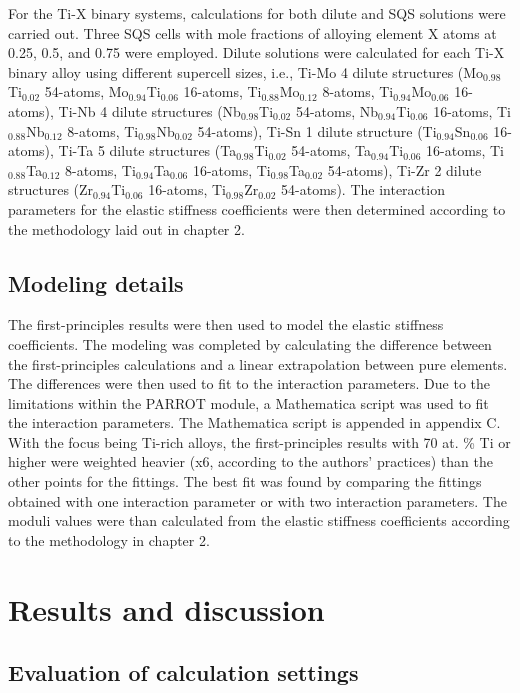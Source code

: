 For the Ti-X binary systems, calculations for both dilute and SQS solutions were carried out. Three SQS cells with mole fractions of alloying element X atoms at 0.25, 0.5, and 0.75 were employed. Dilute solutions were calculated for each Ti-X binary alloy using different supercell sizes, i.e., Ti-Mo 4 dilute structures (Mo$_{0.98}$Ti$_{0.02}$ 54-atoms, Mo$_{0.94}$Ti$_{0.06}$ 16-atoms, Ti$_{0.88}$Mo$_{0.12}$ 8-atoms, Ti$_{0.94}$Mo$_{0.06}$ 16-atoms), Ti-Nb 4 dilute structures (Nb$_{0.98}$Ti$_{0.02}$ 54-atoms, Nb$_{0.94}$Ti$_{0.06}$ 16-atoms, Ti$_{0.88}$Nb$_{0.12}$ 8-atoms, Ti$_{0.98}$Nb$_{0.02}$ 54-atoms), Ti-Sn 1 dilute structure (Ti$_{0.94}$Sn$_{0.06}$ 16-atoms), Ti-Ta 5 dilute structures (Ta$_{0.98}$Ti$_{0.02}$ 54-atoms, Ta$_{0.94}$Ti$_{0.06}$ 16-atoms, Ti$_{0.88}$Ta$_{0.12}$ 8-atoms, Ti$_{0.94}$Ta$_{0.06}$ 16-atoms, Ti$_{0.98}$Ta$_{0.02}$ 54-atoms), Ti-Zr 2 dilute structures (Zr$_{0.94}$Ti$_{0.06}$ 16-atoms, Ti$_{0.98}$Zr$_{0.02}$ 54-atoms). The interaction parameters for the  elastic stiffness coefficients were then determined according to the methodology laid out in chapter 2.

\subsection{Modeling details}

The first-principles results were then used to model the elastic stiffness coefficients. The modeling was completed by calculating the difference between the first-principles calculations and a linear extrapolation between pure elements. The differences were then used to fit to the interaction parameters. Due to the limitations within the PARROT module, a Mathematica script was used to fit the interaction parameters. The Mathematica script is appended in appendix C. With the focus being Ti-rich alloys, the first-principles results with 70 at. \% Ti or higher were weighted heavier (x6, according to the authors' practices) than the other points for the fittings. The best fit was found by comparing the fittings obtained with one interaction parameter or with two interaction parameters. The moduli values were than calculated from the elastic stiffness coefficients according to the methodology in chapter 2.

\section{Results and discussion}

\subsection{Evaluation of calculation settings}


